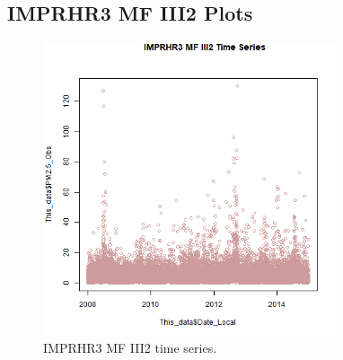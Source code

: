
\subsection{IMPRHR3 MF III2 Plots}
\begin{figure} 
\centering 
\includegraphics[width=0.77\textwidth]{Code_Outputs/IMPRHR3MFIII2_time_series.png} 
\caption{\label{fig:IMPRHR3MFIII2TS}IMPRHR3 MF III2 time series.} 
\end{figure} 
 
